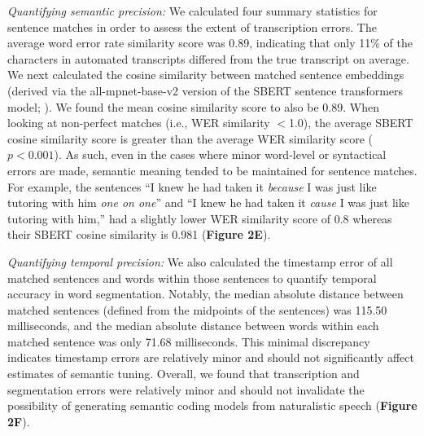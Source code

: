 \documentclass[pdflatex,sn-basic]{sn-jnl}%
\theoremstyle{thmstyleone}%
\theoremstyle{thmstyletwo}%
\theoremstyle{thmstylethree}%
\begin{document}
\textit{Quantifying semantic precision:} We calculated four summary statistics for sentence matches in order to assess the extent of transcription errors. The average word error rate similarity score was 0.89, indicating that only 11\% of the characters in automated transcripts differed from the true transcript on average. We next calculated the cosine similarity between matched sentence embeddings (derived via the all-mpnet-base-v2 version of the SBERT sentence transformers model; \citealp{bib54}). We found the mean cosine similarity score to also be 0.89. When looking at non-perfect matches (i.e., WER similarity $<$1.0), the average SBERT cosine similarity score is greater than the average WER similarity score ($p<0.001$). As such, even in the cases where minor word-level or syntactical errors are made, semantic meaning tended to be maintained for sentence matches. For example, the sentences ``I knew he had taken it \textit{because} I was just like tutoring with him \textit{one on one}'' and ``I knew he had taken it \textit{cause} I was just like tutoring with him,'' had a slightly lower WER similarity score of 0.8 whereas their SBERT cosine similarity is 0.981 (\textbf{Figure 2E}).

\textit{Quantifying temporal precision:} We also calculated the timestamp error of all matched sentences and words within those sentences to quantify temporal accuracy in word segmentation. Notably, the median absolute distance between matched sentences (defined from the midpoints of the sentences) was 115.50 milliseconds, and the median absolute distance between words within each matched sentence was only 71.68 milliseconds. This minimal discrepancy indicates timestamp errors are relatively minor and should not significantly affect estimates of semantic tuning. Overall, we found that transcription and segmentation errors were relatively minor and should not invalidate the possibility of generating semantic coding models from naturalistic speech (\textbf{Figure 2F}).
\end{document}

